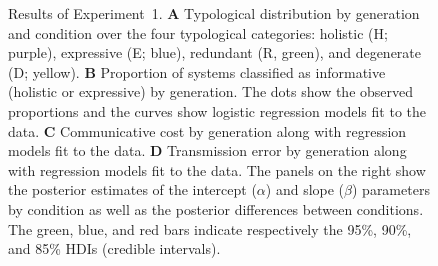 \documentclass[doc,biblatex]{apa7}
\begin{document}
	\begin{figure}
	\vspace*{2pt}
	\caption{Results of Experiment~1. \textbf{A} Typological distribution by generation and condition over the four typological categories: holistic (H; purple), expressive (E; blue), redundant (R, green), and degenerate (D; yellow). \textbf{B} Proportion of systems classified as informative (holistic or expressive) by generation. The dots show the observed proportions and the curves show logistic regression models fit to the data. \textbf{C} Communicative cost by generation along with regression models fit to the data. \textbf{D} Transmission error by generation along with regression models fit to the data. The panels on the right show the posterior estimates of the intercept ($\alpha$) and slope ($\beta$) parameters by condition as well as the posterior differences between conditions. The green, blue, and red bars indicate respectively the 95\%, 90\%, and 85\% HDIs (credible intervals).}
	\label{fig07}
	\end{figure}
\end{document}
